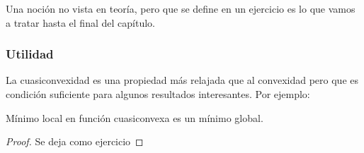 Una noción no vista en teoría, pero que se define en un ejercicio es lo que vamos a tratar hasta el final del capítulo.



\subsubsection{Utilidad}

La cuasiconvexidad es una propiedad más relajada que al convexidad pero que es condición suficiente para algunos resultados interesantes. Por ejemplo:

\begin{prop}
Mínimo local en función cuasiconvexa es un mínimo global.
\end{prop}

\begin{proof}
Se deja como ejercicio
\end{proof}
